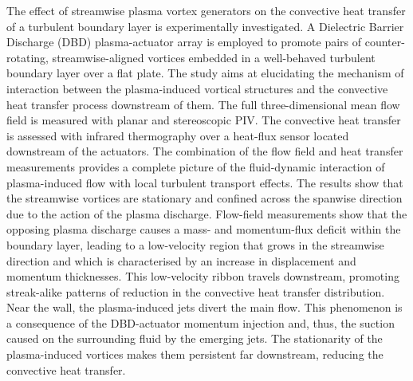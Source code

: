 %
\graphicspath{{paper2/}}%
%
%
%
\begin{paper}

\makepapertitle

%
\begin{paperabstract}
	The effect of streamwise plasma vortex generators on the convective heat transfer of a turbulent boundary layer is experimentally investigated. A Dielectric Barrier Discharge (DBD) plasma-actuator array is employed to promote pairs of counter-rotating, streamwise-aligned vortices embedded in a well-behaved turbulent boundary layer over a flat plate. The study aims at elucidating the mechanism of interaction between the plasma-induced vortical structures and the convective heat transfer process downstream of them. The full three-dimensional mean flow field is measured with planar and stereoscopic PIV. The convective heat transfer is assessed with infrared thermography over a heat-flux sensor located downstream of the actuators. The combination of the flow field and heat transfer measurements provides a complete picture of the fluid-dynamic interaction of plasma-induced flow with local turbulent transport effects. The results show that the streamwise vortices are stationary and confined across the spanwise direction due to the action of the plasma discharge. Flow-field measurements show that the opposing plasma discharge causes a mass- and momentum-flux deficit within the boundary layer, leading to a low-velocity region that grows in the streamwise direction and which is characterised by an increase in displacement and momentum thicknesses. This low-velocity ribbon travels downstream, promoting streak-alike patterns of reduction in the convective heat transfer distribution. Near the wall, the plasma-induced jets divert the main flow. This phenomenon is a consequence of the DBD-actuator momentum injection and, thus, the suction caused on the surrounding fluid by the emerging jets. The stationarity of the plasma-induced vortices makes them persistent far downstream, reducing the convective heat transfer.

\end{paperabstract}



\end{paper}
